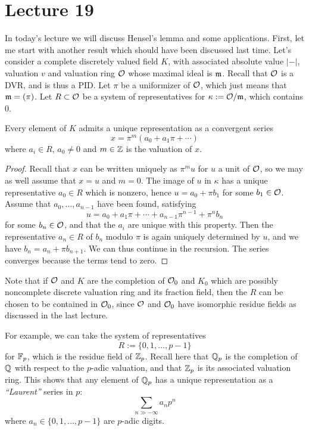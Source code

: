 \section{Lecture 19}

In today's lecture we will discuss Hensel's lemma and some applications.
First, let me start with another result which should have been discussed last time.
Let's consider a complete discretely valued field $K$, with associated absolute value $|-|$, valuation $v$ and valuation ring $\mathcal{O}$ whose maximal ideal is $\mathfrak{m}$.
Recall that $\mathcal{O}$ is a DVR, and is thus a PID.
Let $\pi$ be a uniformizer of $\mathcal{O}$, which just means that $\mathfrak{m} = (\pi)$.
Let $R \subset \mathcal{O}$ be a system of representatives for $\kappa := \mathcal{O}/\mathfrak{m}$, which contains $0$.

\begin{theorem}
  Every element of $K$ admits a unique representation as a convergent series
  \[ x = \pi^{m}(a_{0} + a_{1}\pi + \cdots) \]
  where $a_{i} \in R$, $a_{0} \neq 0$ and $m \in \mathbb{Z}$ is the valuation of $x$.
\end{theorem}
\begin{proof}
  Recall that $x$ can be written uniquely as $\pi^{m} u$ for $u$ a unit of $\mathcal{O}$, so we may as well assume that $x = u$ and $m = 0$.
  The image of $u$ in $\kappa$ has a unique representative $a_{0} \in R$ which is nonzero, hence $u = a_{0} + \pi b_{1}$ for some $b_{1} \in \mathcal{O}$.
  Assume that $a_{0},\ldots,a_{n-1}$ have been found, satisfying
  \[ u = a_{0} + a_{1}\pi + \cdots + a_{n-1}\pi^{n-1} + \pi^{n} b_{n} \]
  for some $b_{n} \in \mathcal{O}$, and that the $a_{i}$ are unique with this property.
  Then the representative $a_{n} \in R$ of $b_{n}$ modulo $\pi$ is again uniquely determined by $u$, and we have $b_{n} = a_{n} + \pi b_{n+1}$.
  We can thus continue in the recursion.
  The series converges because the terms tend to zero.
\end{proof}

Note that if $\mathcal{O}$  and $K$ are the completion of $\mathcal{O}_{0}$ and $K_{0}$ which are possibly noncomplete discrete valuation ring and its fraction field, then the $R$ can be chosen to be contained in $\mathcal{O}_{0}$, since $\mathcal{O}$ and $\mathcal{O}_{0}$ have isomorphic residue fields as discussed in the last lecture.

For example, we can take the system of representatives
\[ R := \{0,1,\ldots,p-1\} \]
for $\mathbb{F}_{p}$, which is the residue field of $\mathbb{Z}_{p}$.
Recall here that $\mathbb{Q}_{p}$ is the completion of $\mathbb{Q}$ with respect to the $p$-adic valuation, and that $\mathbb{Z}_{p}$ is its associated valuation ring.
This shows that any element of $\mathbb{Q}_{p}$ has a unique representation as a \emph{``Laurent''} series in $p$:
\[ \sum_{n \gg -\infty} a_{n} p^{n} \]
where $a_{n} \in \{0,1,\ldots,p-1\}$ are $p$-adic digits.

